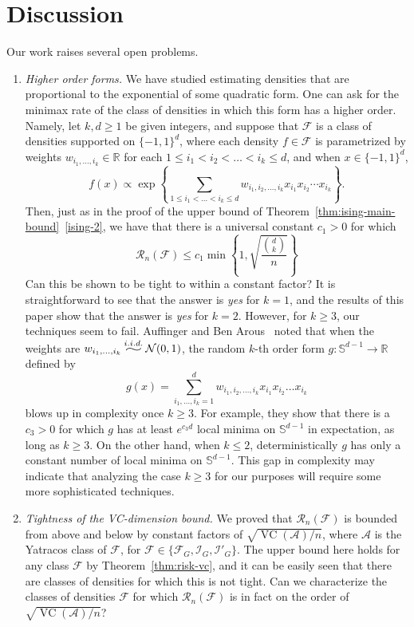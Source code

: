 \documentclass[letterpaper]{amsart}
\newcommand{\bS}{\mathbb{S}}
\newcommand{\sI}{\mathcal{I}}
\newcommand{\sF}{\mathcal{F}}
\newcommand{\sR}{\mathcal{R}}
\newcommand{\sA}{\mathcal{A}}
\newcommand{\sN}{\mathcal{N}}
\newcommand{\R}{\mathbb{R}}
\DeclareMathOperator{\VC}{VC}
\newcommand{\widesim}[2][1.5]{
  \mathrel{\overset{#2}{\scalebox{#1}[1]{$\sim$}}}
}
\newcommand{\iid}{\mathbin{\widesim[2]{i.i.d.}}}
\let\originalleft\left
\let\originalright\right
\def\left#1{\mathopen{}\originalleft#1}
\def\right#1{\originalright#1\mathclose{}}
\newcommand{\seclabel}[1]{\label{sec:#1}}
\newcommand{\thmref}[1]{Theorem~\ref{thm:#1}}
\numberwithin{thm}{section}
\theoremstyle{definition}
\theoremstyle{plain}
\begin{document}
\section{Discussion}\seclabel{conclusion}
Our work raises several open problems.
\begin{enumerate}[label=\textit{\arabic*.}]
\item \textit{Higher order forms.} We have studied estimating
  densities that are proportional to the exponential of some quadratic
  form. One can ask for the minimax rate of the class of densities in
  which this form has a higher order. Namely, let $k, d \ge 1$ be
  given integers, and suppose that $\sF$ is a class of densities
  supported on $\{-1, 1\}^d$, where each density $f \in \sF$ is
  parametrized by weights $w_{i_1, \dots, i_k} \in \R$ for each
  $1 \le i_1 < i_2 < \dots < i_k \le d$, and when $x \in \{-1, 1\}^d$,
  \[
    f(x) \propto \exp\left\{\sum_{1 \le i_1 < \dots < i_k \le d} w_{i_1, i_2, \dots,
        i_k} x_{i_1} x_{i_2} \cdots x_{i_k} \right\} .
  \]
  Then, just as in the proof of the upper bound of
  \thmref{ising-main-bound}~\ref{ising-2}, we have that there is a
  universal constant $c_1 > 0$ for which
  \[
  	\sR_n(\sF) \le c_1 \min\left\{1, \sqrt{ \frac{\binom{d}{k}}{n} } \right\}
  \]
  Can this be shown to be tight to within a constant factor? It is
  straightforward to see that the answer is \emph{yes} for $k = 1$,
  and the results of this paper show that the answer is \emph{yes} for
  $k = 2$. However, for $k \ge 3$, our techniques seem to
  fail. Auffinger and Ben Arous~\cite{auffinger} noted that when the
  weights are $w_{i_1, \dots, i_k} \iid \sN(0, 1)$, the random $k$-th
  order form $g \colon \bS^{d - 1} \to \R$ defined by
  \[
  	g(x) = \sum_{i_1,  \dots, i_k = 1}^d w_{i_1, i_2, \dots, i_k} x_{i_1} x_{i_2} \dots x_{i_k} 
  \]
  blows up in complexity once $k \ge 3$. For example, they show that
  there is a $c_3 > 0$ for which $g$ has at least $e^{c_3 d}$ local
  minima on $\bS^{d - 1}$ in expectation, as long as $k \ge 3$. On the
  other hand, when $k \le 2$, deterministically $g$ has only a
  constant number of local minima on $\bS^{d - 1}$. This gap in
  complexity may indicate that analyzing the case $k \ge 3$ for our
  purposes will require some more sophisticated techniques.

\item \textit{Tightness of the VC-dimension bound.}  We proved that
  $\sR_n(\sF)$ is bounded from above and below by constant factors of
  $\sqrt{\VC(\sA)/n}$, where $\sA$ is the Yatracos class of $\sF$, for
  $\sF \in \{ \sF_G, \sI_G, \sI'_G\}$. The upper bound here holds for
  any class $\sF$ by \thmref{risk-vc}, and it can be easily seen that
  there are classes of densities for which this is not tight.  Can we
  characterize the classes of densities $\sF$ for which $\sR_n(\sF)$
  is in fact on the order of $\sqrt{\VC(\sA)/n}$?


\end{enumerate}
\end{document}
